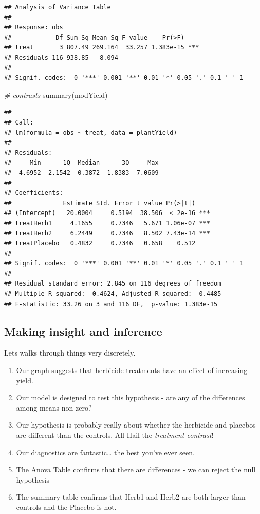 \documentclass[
]{book}
\newenvironment{Shaded}{\begin{snugshade}}{\end{snugshade}}
\newcommand{\CommentTok}[1]{\textcolor[rgb]{0.56,0.35,0.01}{\textit{#1}}}
\newcommand{\FunctionTok}[1]{\textcolor[rgb]{0.00,0.00,0.00}{#1}}
\newcommand{\NormalTok}[1]{#1}
\providecommand{\tightlist}{%
  \setlength{\itemsep}{0pt}\setlength{\parskip}{0pt}}
\begin{document}
\begin{verbatim}
## Analysis of Variance Table
## 
## Response: obs
##            Df Sum Sq Mean Sq F value    Pr(>F)    
## treat       3 807.49 269.164  33.257 1.383e-15 ***
## Residuals 116 938.85   8.094                      
## ---
## Signif. codes:  0 '***' 0.001 '**' 0.01 '*' 0.05 '.' 0.1 ' ' 1
\end{verbatim}

\begin{Shaded}
\begin{Highlighting}[]
\CommentTok{\# contrasts}
\FunctionTok{summary}\NormalTok{(modYield)}
\end{Highlighting}
\end{Shaded}

\begin{verbatim}
## 
## Call:
## lm(formula = obs ~ treat, data = plantYield)
## 
## Residuals:
##     Min      1Q  Median      3Q     Max 
## -4.6952 -2.1542 -0.3872  1.8383  7.0609 
## 
## Coefficients:
##              Estimate Std. Error t value Pr(>|t|)    
## (Intercept)   20.0004     0.5194  38.506  < 2e-16 ***
## treatHerb1     4.1655     0.7346   5.671 1.06e-07 ***
## treatHerb2     6.2449     0.7346   8.502 7.43e-14 ***
## treatPlacebo   0.4832     0.7346   0.658    0.512    
## ---
## Signif. codes:  0 '***' 0.001 '**' 0.01 '*' 0.05 '.' 0.1 ' ' 1
## 
## Residual standard error: 2.845 on 116 degrees of freedom
## Multiple R-squared:  0.4624, Adjusted R-squared:  0.4485 
## F-statistic: 33.26 on 3 and 116 DF,  p-value: 1.383e-15
\end{verbatim}

\hypertarget{making-insight-and-inference}{%
\subsection{Making insight and inference}\label{making-insight-and-inference}}

Lets walks through things very discretely.

\begin{enumerate}
\def\labelenumi{\arabic{enumi}.}
\tightlist
\item
  Our graph suggests that herbicide treatments have an effect of increasing yield.
\item
  Our model is designed to test this hypothesis - are any of the differences among means non-zero?
\item
  Our hypothesis is probably really about whether the herbicide and placebos are different than the controls. All Hail the \emph{treatment contrast}!
\item
  Our diagnostics are fantastic\ldots{} the best you've ever seen.
\item
  The Anova Table confirms that there are differences - we can reject the null hypothesis
\item
  The summary table confirms that Herb1 and Herb2 are both larger than controls and the Placebo is not.
\end{enumerate}
\end{document}
